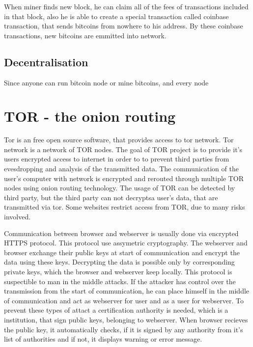 \documentclass[
  digital, %
  table,   %
  lof,     %
  lot,     %
  oneside
]{fithesis3}
\begin{document}
When miner finds new block, he can claim all of the fees of transactions included in that block,
also he is able to create a special transaction called coinbase transaction, that sends bitcoins from nowhere to his address.
By these coinbase transactions, new bitcoins are emmitted into network.

\subsection{Decentralisation}

Since anyone can run bitcoin node or mine bitcoins, and every node

\section{TOR - the onion routing}

Tor is an free open source software, that provides access to tor network. Tor network is a network of TOR nodes.
The goal of TOR project is to provide it's users encrypted access to internet in order to to prevent third parties
from evesdropping and analysis of the transmitted data.
The communication of the user's computer with network is encrypted and rerouted through multiple TOR nodes using onion routing technology.
The usage of TOR can be detected by third party, but the third party can not decryptsa user's data, that are transmitted via tor.
Some websites restrict access from TOR, due to many risks involved.

Communication between browser and webserver is usually done via encrypted HTTPS protocol.
This protocol use assymetric cryptography. The webserver and browser exchange their public keys at start of communication
and encrypt the data using these keys. Decrypting the data is possible only by corresponding private keys,
which the browser and webserver keep locally. This protocol is suspectible to man in the middle attacks.
If the attacker has control over the transmission from the start of communication, he can place himself in the middle
 of communication and act as webserver for user and as a user for webserver. To prevent these types of attact
 a certification authority is needed, which is a institution, that sign public keys, belonging to webserver.
 When browser recieves the public key, it automatically checks, if it is signed by any authority from it's list of authorities
 and if not, it displays warning or error message.
 
\end{document}
